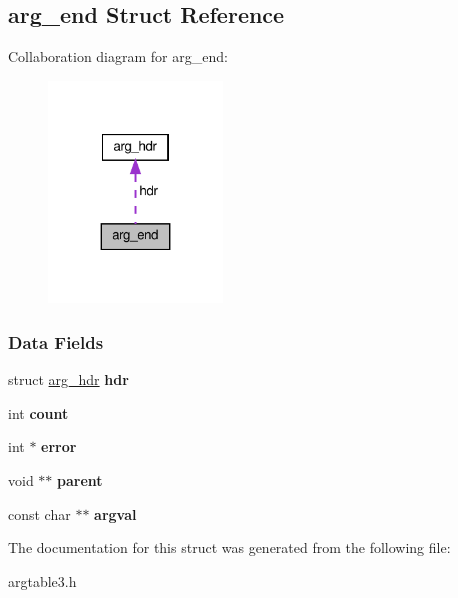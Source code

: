 \hypertarget{structarg__end}{}\subsection{arg\+\_\+end Struct Reference}
\label{structarg__end}


Collaboration diagram for arg\+\_\+end\+:\nopagebreak
\begin{figure}[H]
\begin{center}
\leavevmode
\includegraphics[width=131pt]{structarg__end__coll__graph}
\end{center}
\end{figure}
\subsubsection*{Data Fields}
\begin{DoxyCompactItemize}
\item 
\mbox{\label{structarg__end_a5a09c1c05e96501d3c4807d7ffdeb7d0}} 
struct \hyperlink{structarg__hdr}{arg\+\_\+hdr} {\bfseries hdr}
\item 
\mbox{\label{structarg__end_ae2996b25150e53ce4986c22f031492bd}} 
int {\bfseries count}
\item 
\mbox{\label{structarg__end_a2ac6a156775d0c8a4570efea27270618}} 
int $\ast$ {\bfseries error}
\item 
\mbox{\label{structarg__end_a147ab7eeebf5412bc47b6df87ec24b60}} 
void $\ast$$\ast$ {\bfseries parent}
\item 
\mbox{\label{structarg__end_abef36034ebc3ba28f53d1b6896e329a6}} 
const char $\ast$$\ast$ {\bfseries argval}
\end{DoxyCompactItemize}


The documentation for this struct was generated from the following file\+:\begin{DoxyCompactItemize}
\item 
argtable3.\+h\end{DoxyCompactItemize}
